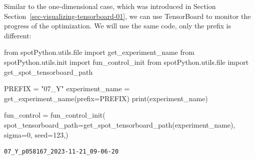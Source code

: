 \documentclass[
  letterpaper,
  DIV=11,
  numbers=noendperiod]{scrreprt}
\newenvironment{Shaded}{\begin{snugshade}}{\end{snugshade}}
\newcommand{\BuiltInTok}[1]{\textcolor[rgb]{0.00,0.23,0.31}{#1}}
\newcommand{\DecValTok}[1]{\textcolor[rgb]{0.68,0.00,0.00}{#1}}
\newcommand{\ImportTok}[1]{\textcolor[rgb]{0.00,0.46,0.62}{#1}}
\newcommand{\NormalTok}[1]{\textcolor[rgb]{0.00,0.23,0.31}{#1}}
\newcommand{\OperatorTok}[1]{\textcolor[rgb]{0.37,0.37,0.37}{#1}}
\newcommand{\StringTok}[1]{\textcolor[rgb]{0.13,0.47,0.30}{#1}}
\begin{document}
\begin{tcolorbox}[enhanced jigsaw, rightrule=.15mm, opacityback=0, colframe=quarto-callout-note-color-frame, opacitybacktitle=0.6, toptitle=1mm, arc=.35mm, colbacktitle=quarto-callout-note-color!10!white, coltitle=black, toprule=.15mm, leftrule=.75mm, titlerule=0mm, title=\textcolor{quarto-callout-note-color}{\faInfo}\hspace{0.5em}{TensorBoard}, bottomrule=.15mm, breakable, bottomtitle=1mm, left=2mm, colback=white]

Similar to the one-dimensional case, which was introduced in Section
Section~\ref{sec-visualizing-tensorboard-01}, we can use TensorBoard to
monitor the progress of the optimization. We will use the same code,
only the prefix is different:

\begin{Shaded}
\begin{Highlighting}[]
\ImportTok{from}\NormalTok{ spotPython.utils.}\BuiltInTok{file} \ImportTok{import}\NormalTok{ get\_experiment\_name}
\ImportTok{from}\NormalTok{ spotPython.utils.init }\ImportTok{import}\NormalTok{ fun\_control\_init}
\ImportTok{from}\NormalTok{ spotPython.utils.}\BuiltInTok{file} \ImportTok{import}\NormalTok{ get\_spot\_tensorboard\_path}

\NormalTok{PREFIX }\OperatorTok{=} \StringTok{"07\_Y"}
\NormalTok{experiment\_name }\OperatorTok{=}\NormalTok{ get\_experiment\_name(prefix}\OperatorTok{=}\NormalTok{PREFIX)}
\BuiltInTok{print}\NormalTok{(experiment\_name)}

\NormalTok{fun\_control }\OperatorTok{=}\NormalTok{ fun\_control\_init(}
\NormalTok{    spot\_tensorboard\_path}\OperatorTok{=}\NormalTok{get\_spot\_tensorboard\_path(experiment\_name),}
\NormalTok{    sigma}\OperatorTok{=}\DecValTok{0}\NormalTok{,}
\NormalTok{    seed}\OperatorTok{=}\DecValTok{123}\NormalTok{,)}
\end{Highlighting}
\end{Shaded}

\begin{verbatim}
07_Y_p058167_2023-11-21_09-06-20
\end{verbatim}

\end{tcolorbox}
\end{document}
